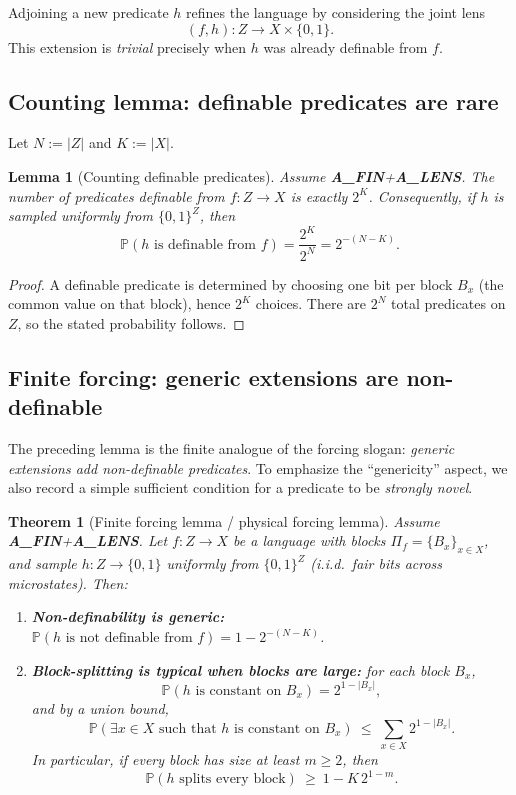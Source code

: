\documentclass[11pt]{article}
\newtheorem{lemma}{Lemma}
\newtheorem{theorem}{Theorem}
\theoremstyle{remark}
\begin{document}
Adjoining a new predicate $h$ refines the language by considering the joint lens
\[
(f,h): Z \to X\times\{0,1\}.
\]
This extension is \emph{trivial} precisely when $h$ was already definable from $f$.

\subsection{Counting lemma: definable predicates are rare}

Let $N:=|Z|$ and $K:=|X|$.

\begin{lemma}[Counting definable predicates]\label{lem:count-definable}
Assume \textbf{A\_FIN}+\textbf{A\_LENS}.
The number of predicates definable from $f:Z\to X$ is exactly $2^K$.
Consequently, if $h$ is sampled uniformly from $\{0,1\}^Z$, then
\[
\mathbb P(h \text{ is definable from } f)=\frac{2^K}{2^N}=2^{-(N-K)}.
\]
\end{lemma}

\begin{proof}
A definable predicate is determined by choosing one bit per block $B_x$ (the common value on that block), hence $2^K$ choices.
There are $2^N$ total predicates on $Z$, so the stated probability follows.
\end{proof}

\subsection{Finite forcing: generic extensions are non-definable}

The preceding lemma is the finite analogue of the forcing slogan: \emph{generic extensions add non-definable predicates}.
To emphasize the “genericity” aspect, we also record a simple sufficient condition for a predicate to be \emph{strongly novel}.

\begin{theorem}[Finite forcing lemma / physical forcing lemma]\label{thm:finite-forcing}
Assume \textbf{A\_FIN}+\textbf{A\_LENS}.
Let $f:Z\to X$ be a language with blocks $\Pi_f=\{B_x\}_{x\in X}$, and sample $h:Z\to\{0,1\}$ uniformly from $\{0,1\}^Z$ (i.i.d.\ fair bits across microstates).
Then:
\begin{enumerate}
\item \textbf{Non-definability is generic:} $\mathbb P(h \text{ is not definable from } f)=1-2^{-(N-K)}$.
\item \textbf{Block-splitting is typical when blocks are large:}
for each block $B_x$,
\[
\mathbb P(h \text{ is constant on } B_x)=2^{1-|B_x|},
\]
and by a union bound,
\[
\mathbb P(\exists x\in X\text{ such that }h\text{ is constant on }B_x)\ \le\ \sum_{x\in X} 2^{1-|B_x|}.
\]
In particular, if every block has size at least $m\ge 2$, then
\[
\mathbb P(h \text{ splits every block}) \ \ge\ 1 - K\,2^{1-m}.
\]
\end{enumerate}
\end{theorem}
\end{document}
